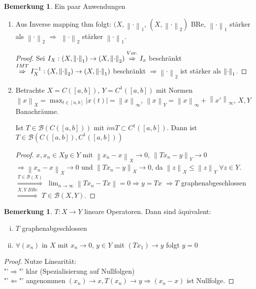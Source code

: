 \documentclass[ngerman]{report}
\theoremstyle{plain}%
\theoremstyle{definition}%
\theoremstyle{myStyle}
\newtheorem{bem}[thm]{Bemerkung}
\newcommand{\B}{\mathcal{B}} %
\newcommand{\BS}[1][X,Y]{\mathcal{B}(#1)} %
\newcommand{\norm}[1]{\left \|#1\right\| }
\newcommand{\df}[1][]{%
	\overset{#1}{\Rightarrow}
}
\newcommand{\limes}[1][\infty]{\lim_{n \to #1}}
\newcommand{\spcm}[1][-0.8]{\vspace{#1 em}} %
\begin{document}
	\begin{bem}
		Ein paar Anwendungen
		\begin{enumerate}
			\item Aus Inverse mapping thm folgt: $(X,\norm{\cdot}_1$, $(X,\norm{\cdot}_2)$ BRe, $\norm{\cdot}_1$ stärker als $\norm{\cdot}_2$ $\df$
				 $\norm{\cdot}_2$ stärker $\norm{\cdot}_1$.
				 \begin{proof}
						\spcm
						Sei $I_X: (X,\norm{\cdot}_1)\to(X,\norm{\cdot}_2) \overset{Vor.}{\df}  I_x$ beschränkt $\overset{IMT}{\df} I_X^{-1}
						: (X,\norm{\cdot}_2) \to (X,\norm{\cdot}_1)$ beschränkt $\df \norm{\cdot}_2$ ist stärker als $\norm{\cdot}_1 \spcm$.
				 \end{proof}
			\item Betrachte $X = C([a,b])$, $Y = C^1([a,b])$ mit Normen $\norm{x}_X = \max_{t\in[a,b]} |x(t) | = \norm{x}_\infty$, $\norm{x}_Y = \norm{x}_\infty + \norm{x'}_\infty$, $X,Y$ Banachräume.\par
			Ist $T\in \B(C([a,b]))$ mit $imT \subset C^1([a,b])$. Dann ist $T\in \B(C([a,b]), C^1([a,b]))$
				\begin{proof}
					$x, x_n \in X y\in Y$ mit $\norm{x_n - x}_X \to 0$, $\norm{Tx_n - y}_Y \to 0$
					$\df \norm{x_n - x}_X \to 0$ und $\norm{Tx_n - y}_X \to 0$, da $\norm{z}_X \leq \norm{z}_Y \; \forall z\in Y$. $\df[T\in\B(X)]$ $\limes \norm{Tx_n - Tx} = 0 \df y = Tx$
					$\df T$ graphenabgeschlossen $\df[X,Y \; BRe]$ $T\in \BS$.
				\end{proof}
		\end{enumerate}

	\end{bem}

	\begin{bem}
		$T: X\to Y$ lineare Operatoren. Dann sind äquivalent:
			\begin{enumerate}[(i)]
				\item $T$ graphenabgeschlossen 
				\item $\forall (x_n)$ in $X$ mit $x_n \to 0$, $y\in Y$ mit $ (Tx_1) \to y$ folgt $y=0$ 
			\end{enumerate}

		\begin{proof}
			Nutze Linearität:\\
			"'$\df$"' klar (Spezialisierung auf Nullfolgen)\\
			"'$\Leftarrow$"' angenommen $(x_n) \to x, T(x_n) \to y \df (x_n-x)$ ist Nullfolge.
		\end{proof}

	\end{bem}
\end{document}
